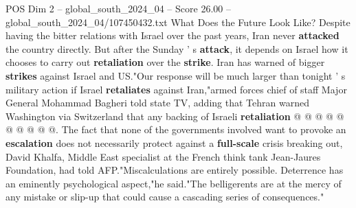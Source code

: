 \begin{textsample}{POS Dim 2 – global\_south\_2024\_04 – Score 26.00 – global\_south\_2024\_04/107450432.txt}
What Does the Future Look Like?
Despite having the bitter relations with Israel over the past years, Iran never \textbf{attacked} the country directly.
But after the Sunday ' s \textbf{attack}, it depends on Israel how it chooses to carry out \textbf{retaliation} over the \textbf{strike}.
Iran has warned of bigger \textbf{strikes} against Israel and US."Our response will be much larger than tonight ' s military action if Israel \textbf{retaliates} against Iran,"armed forces chief of staff Major General Mohammad Bagheri told state TV, adding that Tehran warned Washington via Switzerland that any backing of Israeli \textbf{retaliation} @ @ @ @ @ @ @ @ @ @.
The fact that none of the governments involved want to provoke an \textbf{escalation} does not necessarily protect against a \textbf{full-scale} crisis breaking out, David Khalfa, Middle East specialist at the French think tank Jean-Jaures Foundation, had told AFP."Miscalculations are entirely possible.
Deterrence has an eminently psychological aspect,"he said."The belligerents are at the mercy of any mistake or slip-up that could cause a cascading series of consequences."

\end{textsample}

